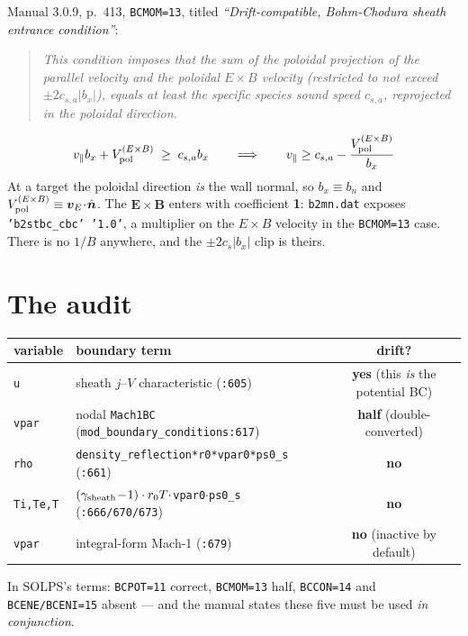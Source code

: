 \documentclass[11pt,a4paper]{article}
\newcommand{\code}[1]{\texttt{\small #1}}
\newcommand{\vE}{\bm v_E}\newcommand{\nhat}{\hat{\bm n}}\newcommand{\that}{\hat{\bm t}}
\begin{document}
Manual 3.0.9, p.\ 413, \code{BCMOM=13}, titled \emph{``Drift-compatible, Bohm-Chodura sheath
entrance condition''}:

\begin{quote}\itshape
This condition imposes that the sum of the poloidal projection of the parallel velocity and
the poloidal $E\times B$ velocity (restricted to not exceed $\pm2c_{s,a}|b_x|$), equals at
least the specific species sound speed $c_{s,a}$, reprojected in the poloidal direction.
\end{quote}
\begin{equation}
  v_\parallel b_x + V^{(E\times B)}_{\rm pol} \;\ge\; c_{s,a} b_x
  \qquad\Longrightarrow\qquad
  v_\parallel \ge c_{s,a} - \frac{V^{(E\times B)}_{\rm pol}}{b_x}
\end{equation}
At a target the poloidal direction \emph{is} the wall normal, so $b_x\equiv b_n$ and
$V^{(E\times B)}_{\rm pol}\equiv\vE\!\cdot\!\nhat$. The $\bm E\times\bm B$ enters with
coefficient \textbf{1}: \code{b2mn.dat} exposes \code{'b2stbc\_cbc' '1.0'}, a multiplier on
the $E\times B$ velocity in the \code{BCMOM=13} case. There is no $1/B$ anywhere, and the
$\pm2c_s|b_x|$ clip is theirs.

\section{The audit}

\begin{center}
\begin{tabular}{llc}
\toprule
variable & boundary term & drift? \\
\midrule
\code{u} & sheath $j$--$V$ characteristic (\code{:605}) & \textbf{yes} (this \emph{is} the potential BC) \\
\code{vpar} & nodal \code{Mach1BC} (\code{mod\_boundary\_conditions:617}) & \textbf{half} (double-converted) \\
\code{rho} & \code{density\_reflection*r0*vpar0*ps0\_s} (\code{:661}) & \textbf{no} \\
\code{Ti,Te,T} & $(\gamma_{\rm sheath}\!-\!1)\cdot r_0 T\cdot$\code{vpar0}$\cdot$\code{ps0\_s} (\code{:666/670/673}) & \textbf{no} \\
\code{vpar} & integral-form Mach-1 (\code{:679}) & \textbf{no} (inactive by default) \\
\bottomrule
\end{tabular}
\end{center}

\noindent In SOLPS's terms: \code{BCPOT=11} correct, \code{BCMOM=13} half, \code{BCCON=14}
and \code{BCENE/BCENI=15} absent --- and the manual states these five must be used
\emph{in conjunction}.
\end{document}
